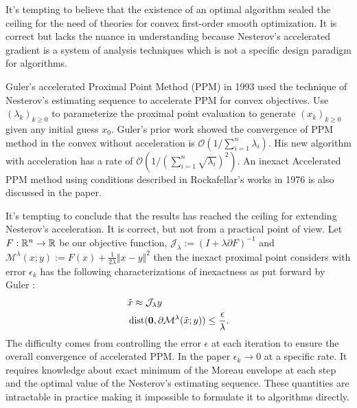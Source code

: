 \documentclass[12pt]{article}
\begin{document}
    It's tempting to believe that the existence of an optimal algorithm sealed the ceiling for the need of theories for convex first-order smooth optimization. 
    It is correct but lacks the nuance in understanding because Nesterov's accelerated gradient is a system of analysis techniques which is not a specific design paradigm for algorithms. 
    
    Guler's accelerated Proximal Point Method (PPM) \cite{guler_new_1992} in 1993 used the technique of Nesterov's estimating sequence to accelerate PPM for convex objectives. 
    Use $(\lambda_k)_{k \ge 0}$ to parameterize the proximal point evaluation to generate $(x_k)_{k\ge 0}$ given any initial guess $x_0$.
    Guler's prior work \cite{guler_convergence_1991} showed the convergence of PPM method in the convex without acceleration is $\mathcal O\left(1/\sum^{n}_{i = 1}\lambda_i\right)$. 
    His new algorithm with acceleration has a rate of $\mathcal O\left(1/(\sum_{i = 1}^{n} \sqrt{\lambda_i})^2\right)$. 
    An inexact Accelerated PPM method using conditions described in Rockafellar's works in 1976 \cite{rockafellar_monotone_1976} is also discussed in the paper. 

    It's tempting to conclude that the results has reached the ceiling for extending Nesterov's acceleration. 
    It is correct, but not from a practical point of view. 
    Let $F: \mathbb R^n \rightarrow\mathbb R$ be our objective function, $\mathcal J_\lambda := (I + \lambda \partial F)^{-1}$ and $\mathcal M^{\lambda}(x; y):= F(x) + \frac{1}{2\lambda}\Vert x - y\Vert^2$ then the inexact proximal point considers with error $\epsilon_k$ has the following characterizations of inexactness as put forward by Guler \cite{guler_new_1992}: 
    \begin{align*}
        & \tilde x \approx \mathcal J_\lambda y
        \\
        & 
        \operatorname{dist}(\mathbf 0, \partial\mathcal{M}^{\lambda}(\tilde x; y))
        \le \frac{\epsilon}{\lambda}. 
    \end{align*}
    The difficulty comes from controlling the error $\epsilon$ at each iteration to ensure the overall convergence of accelerated PPM. 
    In the paper $\epsilon_k \rightarrow 0$ at a specific rate. 
    It requires knowledge about exact minimum of the Moreau envelope at each step and the optimal value of the Nesterov's estimating sequence. 
    These quantities are intractable in practice making it impossible to formulate it to algorithms directly. 
\end{document}
